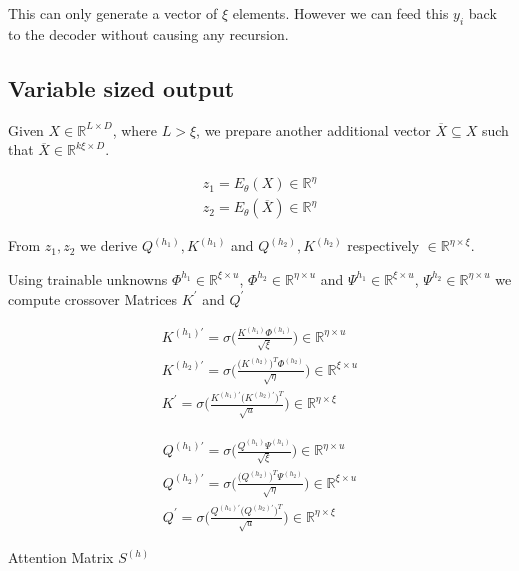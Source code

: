 \documentclass{article}
\begin{document}
This can only generate a vector of $\xi$ elements. However we can feed this $y_{i}$ back to the decoder without causing any recursion.


\subsection{Variable sized output}

Given $X \in \mathbb{R}^{L\times D}$, where $L > \xi$, we prepare another additional vector $\overline{X} \subseteq X$ such that $\overline{X} \in \mathbb{R}^{k\xi\times D}$.

\begin{eqnarray}
	z_{1} = E_{\theta}(X) \in \mathbb{R}^{\eta} \\
	z_{2} = E_{\theta}(\overline{X}) \in \mathbb{R}^{\eta}
\end{eqnarray}

From $z_{1}, z_{2}$ we derive $Q^{(h_{1})}, K^{(h_{1})}$ and $Q^{(h_{2})}, K^{(h_{2})}$ respectively $\in \mathbb{R}^{\eta \times \xi}$.

Using trainable unknowns $\Phi ^{h_{1}} \in \mathbb{R}^{\xi \times u}$, $\Phi ^{h_{2}} \in \mathbb{R}^{\eta \times u}$ and $\Psi ^{h_{1}} \in \mathbb{R}^{\xi \times u}$, $\Psi ^{h_{2}} \in \mathbb{R}^{\eta \times u}$ we compute crossover Matrices $K^{\prime}$ and $Q^{\prime}$

\begin{center}
\begin{minipage}{\textwidth}
	\begin{center}
	\begin{minipage}{0.48\textwidth}
		\begin{eqnarray}
			K^{(h_{1})\prime} = \sigma\Bigg(\frac{K^{(h_{1})} \Phi^{(h_{1})}}{\sqrt{\xi}}\Bigg) \in \mathbb{R}^{\eta \times u} \\
			K^{(h_{2})\prime} = \sigma\Bigg(\frac{\big(K^{(h_{2})}\big)^{T} \Phi^{(h_{2})}}{\sqrt{\eta}}\Bigg) \in \mathbb{R}^{\xi \times u} \\
			K^{\prime} = \sigma\Bigg(\frac{K^{(h_{1})\prime} \Big(K^{(h_{2})\prime}\Big)^{T}}{\sqrt{u}}\Bigg)  \in \mathbb{R}^{\eta \times \xi}
		\end{eqnarray}
	\end{minipage}%
	\begin{minipage}{0.48\textwidth}
		\begin{eqnarray}
			Q^{(h_{1})\prime} = \sigma\Bigg(\frac{Q^{(h_{1})} \Psi^{(h_{1})}}{\sqrt{\xi}}\Bigg) \in \mathbb{R}^{\eta \times u} \\
			Q^{(h_{2})\prime} = \sigma\Bigg(\frac{\big(Q^{(h_{2})}\big)^{T} \Psi^{(h_{2})}}{\sqrt{\eta}}\Bigg) \in \mathbb{R}^{\xi \times u} \\
			Q^{\prime} = \sigma\Bigg(\frac{Q^{(h_{1})\prime} \Big(Q^{(h_{2})\prime}\Big)^{T}}{\sqrt{u}}\Bigg)  \in \mathbb{R}^{\eta \times \xi}
		\end{eqnarray}
	\end{minipage}
	\end{center}
\end{minipage}
\end{center}
\vspace{2mm}
Attention Matrix $S^{(h)}$
\end{document}
